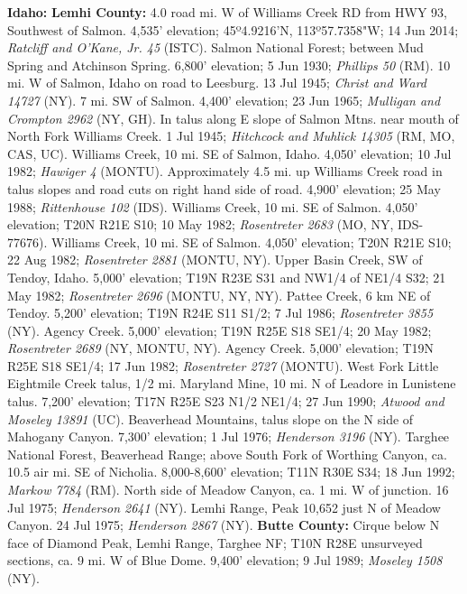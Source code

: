   \textbf{Idaho:}
  \textbf{Lemhi County:}
4.0 road mi. W of Williams Creek RD from HWY 93, Southwest of Salmon.
4,535' elevation; 45º4.9216'N, 113º57.7358"W; 14 Jun 2014;
\textit{Ratcliff and O'Kane, Jr. 45} (ISTC).
Salmon National Forest; between Mud Spring and Atchinson Spring.
6,800' elevation; 5 Jun 1930; \textit{Phillips 50} (RM).
10 mi. W of Salmon, Idaho on road to Leesburg. 13 Jul 1945;
\textit{Christ and Ward 14727} (NY).
7 mi. SW of Salmon. 4,400' elevation; 23 Jun 1965;
\textit{Mulligan and Crompton 2962} (NY, GH).
In talus along E slope of Salmon Mtns. near mouth of North Fork Williams Creek.
1 Jul 1945; \textit{Hitchcock and Muhlick 14305} (RM, MO, CAS, UC).
Williams Creek, 10 mi. SE of Salmon, Idaho. 4,050' elevation; 10 Jul 1982;
\textit{Hawiger 4} (MONTU).
Approximately 4.5 mi. up Williams Creek road in talus slopes and road cuts on
right hand side of road. 4,900' elevation; 25 May 1988;
\textit{Rittenhouse 102} (IDS).
Williams Creek, 10 mi. SE of Salmon. 4,050' elevation; T20N R21E S10;
10 May 1982; \textit{Rosentreter 2683} (MO, NY, IDS-77676).
Williams Creek, 10 mi. SE of Salmon. 4,050' elevation; T20N R21E S10;
22 Aug 1982; \textit{Rosentreter 2881} (MONTU, NY).
Upper Basin Creek, SW of Tendoy, Idaho. 5,000' elevation; T19N R23E S31 and
NW1/4 of NE1/4 S32; 21 May 1982; \textit{Rosentreter 2696} (MONTU, NY, NY).
Pattee Creek, 6 km NE of Tendoy. 5,200' elevation; T19N R24E S11 S1/2;
7 Jul 1986; \textit{Rosentreter 3855} (NY).
Agency Creek. 5,000' elevation; T19N R25E S18 SE1/4;
20 May 1982; \textit{Rosentreter 2689} (NY, MONTU, NY).
Agency Creek. 5,000' elevation; T19N R25E S18 SE1/4; 17 Jun 1982;
\textit{Rosentreter 2727} (MONTU).
West Fork Little Eightmile Creek talus, 1/2 mi. Maryland Mine, 10 mi. N of
Leadore in Lunistene talus. 7,200' elevation; T17N R25E S23 N1/2 NE1/4;
27 Jun 1990; \textit{Atwood and Moseley 13891} (UC).
Beaverhead Mountains, talus slope on the N side of Mahogany Canyon.
7,300' elevation; 1 Jul 1976; \textit{Henderson 3196} (NY).
Targhee National Forest, Beaverhead Range; above South Fork of Worthing Canyon,
ca. 10.5 air mi. SE of Nicholia. 8,000-8,600' elevation; T11N R30E S34;
18 Jun 1992; \textit{Markow 7784} (RM).
North side of Meadow Canyon, ca. 1 mi. W of junction. 16 Jul 1975;
\textit{Henderson 2641} (NY).
Lemhi Range, Peak 10,652 just N of Meadow Canyon. 24 Jul 1975;
\textit{Henderson 2867} (NY).
  \textbf{Butte County:}
Cirque below N face of Diamond Peak, Lemhi Range, Targhee NF; T10N R28E
unsurveyed sections, ca. 9 mi. W of Blue Dome. 9,400' elevation; 9 Jul 1989;
\textit{Moseley 1508} (NY).
